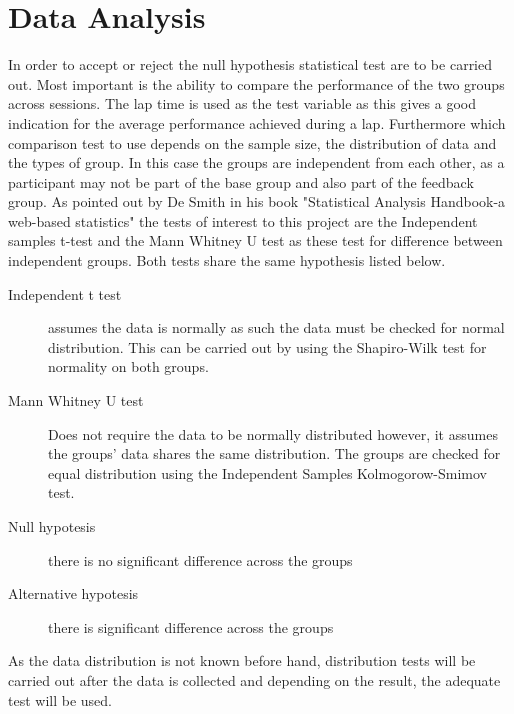 \section{Data Analysis}
\label{sec:meth-data-analysis}
In order to accept or reject the null hypothesis statistical test are to be carried out. Most important is the ability to compare the performance of the two groups across sessions. The lap time is used as the test variable as this gives a good indication for the average performance achieved during a lap. Furthermore which comparison test to use depends on the sample size, the distribution of data and the types of group. In this case the groups are independent from each other, as a participant may not be part of the base group and also part of the feedback group. As pointed out by De Smith in his book "Statistical Analysis Handbook-a web-based statistics" the tests of interest to this project are the Independent samples t-test\cite{de2015statsref} and the Mann Whitney U test\cite{de2015statsref} as these test for difference between independent groups. Both tests share the same hypothesis listed below.

\begin{description}
	\item[Independent t test] assumes the data is normally as such the data must be checked for normal distribution. This can be carried out by using the Shapiro-Wilk\cite{de2015statsref} test for normality on both groups.
	
	\item[Mann Whitney U test] Does not require the data to be normally distributed however, it assumes the groups' data shares the same distribution. The groups are checked for equal distribution using the Independent Samples Kolmogorow-Smimov test.
	
	\item[Null hypotesis]there is no significant difference across the groups
	\item[Alternative hypotesis]there is significant difference across the groups
\end{description}

As the data distribution is not known before hand, distribution tests will be carried out after the data is collected and depending on the result, the adequate test will be used.